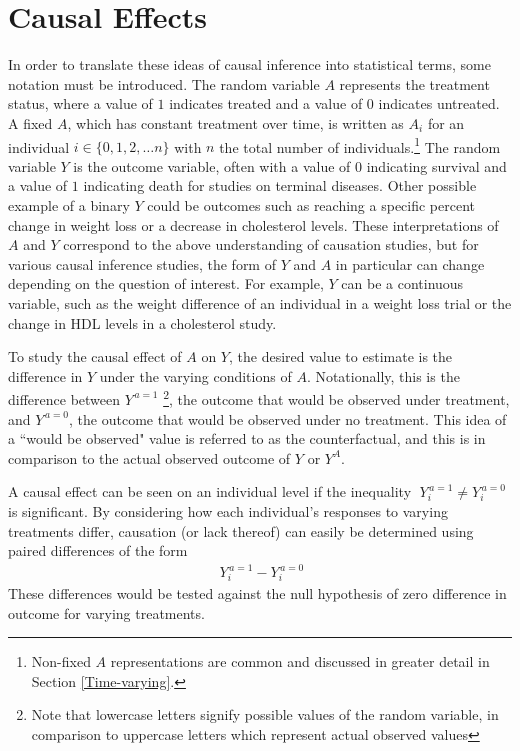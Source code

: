 \section{Causal Effects} 
In order to translate these ideas of causal inference into statistical terms, some notation must be introduced.  The random variable $A$ represents the treatment status, where a value of $1$ indicates treated and a value of $0$ indicates untreated.  A fixed $A$, which has constant treatment over time, is written as $A_i$ for an individual $i \in \{0,1,2,\dots n\}$ with $n$ the total number of individuals.\footnote{Non-fixed $A$ representations are common and discussed in greater detail in Section \ref{Time-varying}.} The random variable $Y$ is the outcome variable, often with a value of $0$ indicating survival and a value of $1$ indicating death for studies on terminal diseases. Other possible example of a binary $Y$ could be outcomes such as reaching a specific percent change in weight loss or a decrease in cholesterol levels.   These interpretations of $A$ and $Y$ correspond to the above understanding of causation studies, but for various causal inference studies, the form of $Y$ and $A$ in particular can change depending on the question of interest.  For example, $Y$ can be a continuous variable, such as the weight difference of an individual in a weight loss trial or the change in HDL levels in a cholesterol study.  

To study the causal effect of $A$ on $Y$, the desired value to estimate is the difference in $Y$ under the varying conditions of $A$.  Notationally, this is the difference between $Y^{\, a=1}$ \footnote{Note that lowercase letters signify possible values of the random variable, in comparison to uppercase letters which represent actual observed values}, the outcome that would be observed under treatment, and $Y^{\, a=0}$, the outcome that would be observed under no treatment.  This idea of a ``would be observed" value is referred to as the counterfactual, and this is in comparison to the actual observed outcome of $Y$ or $Y^A$.  

A causal effect can be seen on an individual level if the inequality $\; Y_i^{\, a=1} \neq Y_i^{\, a=0}$ is significant.  By considering how each individual's responses to varying treatments differ, causation (or lack thereof) can easily be determined using paired differences of the form 
\begin{align} \; Y_i^{\, a=1} - Y_i^{\, a=0}\end{align} 
These differences would be tested against the null hypothesis of zero difference in outcome for varying treatments.  

